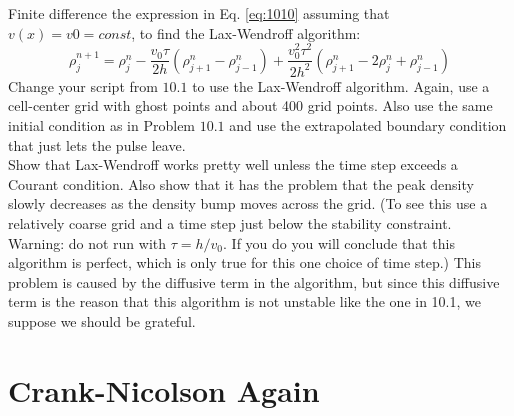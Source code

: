 \begin{problem}\label{P10.2}
 Finite difference the expression in Eq. \ref{eq:1010} assuming that $v(x) = v0 =
const$, to find the Lax-Wendroff algorithm:
\begin{equation}\label{eq:1011}
\rho_{j}^{n+1}=\rho_{j}^{n}-\frac{v_{0} \tau}{2 h}\left(\rho_{j+1}^{n}-\rho_{j-1}^{n}\right)+\frac{v_{0}^{2} \tau^{2}}{2 h^{2}}\left(\rho_{j+1}^{n}-2 \rho_{j}^{n}+\rho_{j-1}^{n}\right)
\end{equation}
Change your script from $10.1$ to use the Lax-Wendroff algorithm. Again, use a cell-center grid with ghost points and about 400 grid points. Also use the same initial condition as in Problem $10.1$ and use the extrapolated boundary condition that just lets the pulse leave.\\
Show that Lax-Wendroff works pretty well unless the time step exceeds a Courant condition. Also show that it has the problem that the peak density slowly decreases as the density bump moves across the grid. (To see this use a relatively coarse grid and a time step just below the stability constraint.\\
Warning: do not run with $\tau=h / v_{0}$. If you do you will conclude that this algorithm is perfect, which is only true for this one choice of time step.) This problem is caused by the diffusive term in the algorithm, but since this diffusive term is the reason that this algorithm is not unstable like the one in 10.1, we suppose we should be grateful.
\end{problem}
\section*{Crank-Nicolson Again}

